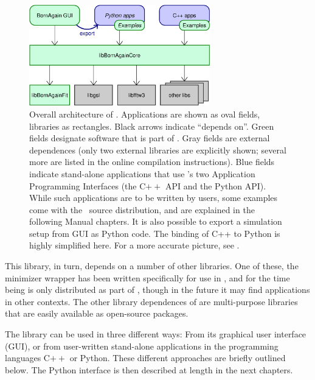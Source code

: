 \begin{figure}[tbh]
\begin{center}
\includegraphics[width=0.7\textwidth]{fig/drawing/architecture1.ps}
\end{center}
\caption{Overall architecture of \BornAgain.
%
Applications are shown as oval fields, libraries as rectangles.
Black arrows indicate ``depends on''.
Green fields designate software that is part of \BornAgain.
Gray fields are external dependences
(only two external libraries are explicitly shown;
several more are listed in the online compilation instructions).
Blue fields indicate stand-alone applications that use \BornAgain's
two Application Programming Interfaces (the C$++$ API and the Python API).
While such applications are to be written by users,
some examples come with the \BornAgain\ source distribution,
and are explained in the following Manual chapters.
It is also possible to export a simulation setup from GUI as Python code.
The binding of C++ to Python is highly simplified here.
For a more accurate picture, see .}
\label{Farch1}
\end{figure}

This library, in turn, depends on a number of other libraries.
One of these, the minimizer wrapper 
has been written specifically for use in \BornAgain,
and for the time being is only distributed as part of \BornAgain,
though in the future it may find applications in other contexts.
The other library dependences of 
are multi-purpose libraries that are easily available as open-source packages.

The library  can be used in three different ways:
From its graphical user interface (GUI), or
from user-written stand-alone applications in the programming languages C$++$ or Python.
These different approaches are briefly outlined below.
The Python interface is then described at length in the next chapters.

